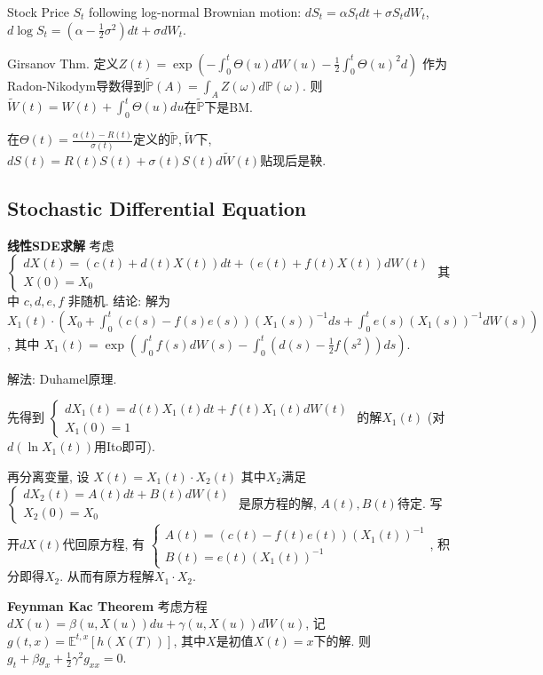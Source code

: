 \documentclass[UTF8]{ctexart}
\begin{document}
Stock Price $S_t$ following log-normal Brownian motion:
$dS_t = \alpha S_t dt + \sigma S_t dW_t$,
$d \log S_t = (\alpha -\frac{1}{2}\sigma^2)dt+\sigma dW_t$.

Girsanov Thm. 
定义$Z(t)=\exp\left(-\int_0^t \Theta(u)dW(u)-\frac12 \int_0^t \Theta(u)^2 d\right)$
作为Radon-Nikodym导数得到$\tilde{\mathbb{P}}(A)=\int_A Z(\omega)d\mathbb{P}(\omega)$.
则$\tilde{W}(t)=W(t)+\int_0^t\Theta(u)du$在$\tilde{\mathbb{P}}$下是BM.

在$\Theta(t)=\frac{\alpha(t)-R(t)}{\sigma(t)}$定义的$\tilde{\mathbb{P}},\tilde{W}$下,
$dS(t)=R(t)S(t)+\sigma(t)S(t)d\tilde{W}(t)$贴现后是鞅.

\subsection{Stochastic Differential Equation}

\textbf{线性SDE求解}  考虑$\left\{\begin{array}{l}
d X(t)=(c(t)+d(t) X(t)) d t+(e(t)+f(t) X(t)) d W(t) \\
X(0)=X_0 \end{array}\right. $
其中 $c,d,e,f$ 非随机. 
结论: 解为 $X_1(t) \cdot\left(X_0+\int_0^t(c(s)-f(s) e(s))\left(X_1(s)\right)^{-1} d s
+\int_0^t e(s) \left(X_1(s)\right)^{-1} d W(s)\right)$,
其中 $X_1(t)=\exp \left(\int_0^t f(s) d W(s)-\int_0^t (d(s)-\frac{1}{2} f(s^2)) d s\right)$.

解法: Duhamel原理.

先得到 $\left\{\begin{array}{l}d X_1(t)=d(t) X_1(t) d t+f(t) X_1(t) d W(t) \\ X_1(0)=1\end{array}\right.$
的解$X_1(t)$ (对$d\left(\ln X_1(t)\right)$用Ito即可).

再分离变量, 设 $X(t)=X_1(t) \cdot X_2(t)$ 其中$X_2$满足 $\left\{\begin{array}{l}d X_2(t)=A(t) d t+B(t) d W(t) \\ X_2(0)=X_0\end{array}\right.$ 
是原方程的解, $A(t),B(t)$待定.
写开$dX(t)$代回原方程, 有
$\left\{\begin{array}{l}
A(t)=(c(t)-f(t) e(t))\left(X_1(t)\right)^{-1} \\
B(t)=e(t)\left(X_1(t)\right)^{-1}
\end{array}\right.$, 积分即得$X_2$. 从而有原方程解$X_1\cdot X_2$.

\textbf{Feynman Kac Theorem}
考虑方程 $dX(u)=\beta(u,X(u))du+\gamma(u,X(u))dW(u)$, 
记$g(t,x)=\mathbb{E}^{t,x}[h(X(T))]$, 其中$X$是初值$X(t)=x$下的解.
则$g_t+\beta g_x+\frac12 \gamma^2 g_{xx}=0$.
\end{document}
